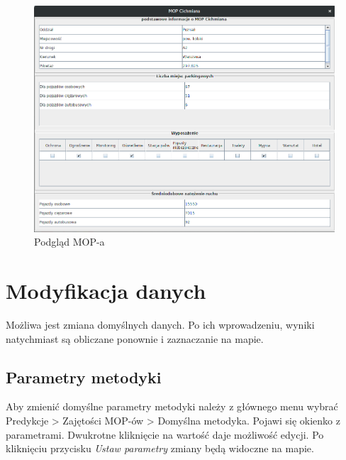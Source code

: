 \documentclass[10pt,paper=a4 BCOR0, DIV15, titlepage=false, oneside]{scrbook} %
\begin{document}
      \begin{figure}[ht]
          \centering
          \includegraphics[width=.8\textwidth]{podglad_mopa.png}
          \caption{Podgląd MOP-a}
      \end{figure}

      \chapter*{Modyfikacja danych}
      \addtocounter{chapter}{1}
      \setcounter{section}{0}

      Możliwa jest zmiana domyślnych danych. Po ich wprowadzeniu, wyniki
      natychmiast są obliczane ponownie i zaznaczanie na mapie.

      \section{Parametry metodyki}
        Aby zmienić domyślne parametry metodyki należy z głównego menu wybrać
        Predykcje > Zajętości MOP-ów > Domyślna metodyka. Pojawi się okienko z
        parametrami. Dwukrotne kliknięcie na wartość daje możliwość edycji. Po
        kliknięciu przycisku \textit{Ustaw parametry} zmiany będą widoczne na
        mapie.
\end{document}
